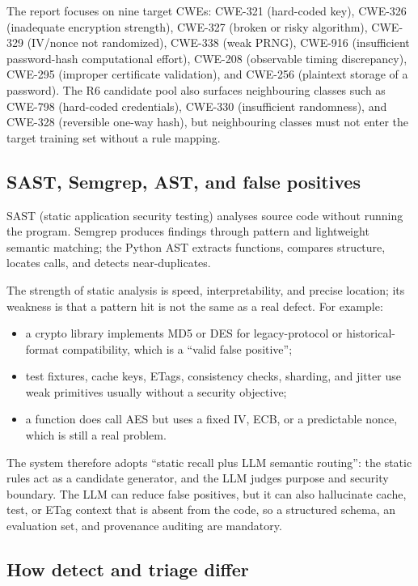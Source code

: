 \documentclass[11pt]{article}
\begin{document}
The report focuses on nine target CWEs: CWE-321 (hard-coded key), CWE-326 (inadequate encryption strength),
CWE-327 (broken or risky algorithm), CWE-329 (IV/nonce not randomized), CWE-338 (weak PRNG), CWE-916
(insufficient password-hash computational effort), CWE-208 (observable timing discrepancy), CWE-295
(improper certificate validation), and CWE-256 (plaintext storage of a password). The R6 candidate pool also
surfaces neighbouring classes such as CWE-798 (hard-coded credentials), CWE-330 (insufficient randomness),
and CWE-328 (reversible one-way hash), but neighbouring classes must not enter the target training set without
a rule mapping.

\subsection{SAST, Semgrep, AST, and false positives}

SAST (static application security testing) analyses source code without running the program. Semgrep produces
findings through pattern and lightweight semantic matching; the Python AST extracts functions, compares
structure, locates calls, and detects near-duplicates.

The strength of static analysis is speed, interpretability, and precise location; its weakness is that a
pattern hit is not the same as a real defect. For example:

\begin{itemize}
  \item a crypto library implements MD5 or DES for legacy-protocol or historical-format compatibility, which
        is a ``valid false positive'';
  \item test fixtures, cache keys, ETags, consistency checks, sharding, and jitter use weak primitives
        usually without a security objective;
  \item a function does call AES but uses a fixed IV, ECB, or a predictable nonce, which is still a real
        problem.
\end{itemize}

The system therefore adopts ``static recall plus LLM semantic routing'': the static rules act as a candidate
generator, and the LLM judges purpose and security boundary. The LLM can reduce false positives, but it can
also hallucinate cache, test, or ETag context that is absent from the code, so a structured schema, an
evaluation set, and provenance auditing are mandatory.

\subsection{How detect and triage differ}
\end{document}
